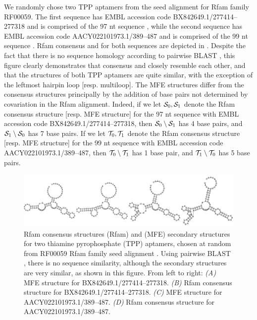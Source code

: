 We randomly chose two TPP \rb
aptamers from the seed alignment for
Rfam family RF00059. The first sequence has EMBL accession code
BX842649.1/277414--277318 and is comprised of the 97 nt sequence
, while the second sequence
has EMBL accession code AACY022101973.1/389--487 and is comprised of the 99
nt sequence
.
Rfam consensus and \mfess for both sequences are
depicted in .
Despite the fact that there is no sequence homology according to
pairwise BLAST \citep{blast}, this figure clearly demonstrates that
consensus and
\mfess closely resemble each other, and that the
structures of both TPP \rb aptamers are quite similar, with the
exception of the leftmost hairpin loop [resp. multiloop].
The MFE structures differ
from the consensus structures principally by the addition of base pairs not
determined by covariation in the Rfam alignment.
Indeed, if we let $\mathcal S_0,\mathcal S_1$
denote the Rfam consensus structure [resp. MFE structure] for the 97 nt
sequence with EMBL accession code BX842649.1/277414--277318, then
$\mathcal S_0 \setminus \mathcal S_1$ has 4 base pairs, and $\mathcal S_1 \setminus \mathcal S_0$
 has 7
base pairs. If we let $\mathcal T_0,\mathcal T_1$
denote the Rfam consensus structure [resp. MFE structure] for the 99 nt
sequence with EMBL accession code
AACY022101973.1/389--487, then
$\mathcal T_0 \setminus \mathcal T_1$ has 1 base pair, and $\mathcal T_1 \setminus \mathcal T_0$ has 5
base pairs.

\begin{figure}[!ht]
\centering
\includegraphics[width=.9\textwidth]{Figures/FFTbor/tppConsensusAndMfe.pdf}
\caption[Rfam consensus structures (Rfam) and \mfe (MFE)
secondary structures for two thiamine pyrophosphate (TPP) \rb aptamers]{Rfam consensus structures (Rfam) and \mfe (MFE)
secondary structures for two thiamine pyrophosphate (TPP) \rb aptamers,
chosen at random from RF00059 Rfam family seed alignment
\citep{Gardner.nar11}. Using pairwise BLAST \citep{blast}, there is no
sequence similarity, although the secondary structures are very similar,
as shown in this figure. From left to right:
{\em (A)} MFE structure for BX842649.1/277414--277318.
{\em (B)} Rfam consensus structure for BX842649.1/277414--277318.
{\em (C)} MFE structure for AACY022101973.1/389--487.
{\em (D)} Rfam consensus structure for AACY022101973.1/389--487.
}
\label{fig:fftbor:tppConsensusAndMfe}
\end{figure}

